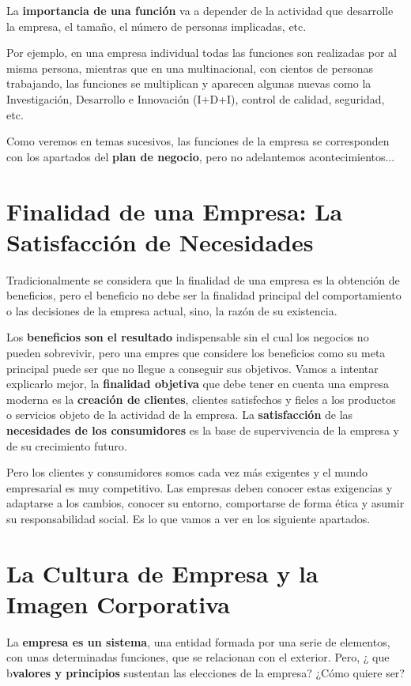 La \textbf{importancia de una función} va a depender de la actividad que desarrolle la empresa, el tamaño, el número de personas implicadas, etc.

Por ejemplo, en una empresa individual todas las funciones son realizadas por al misma persona, mientras que en una multinacional, con cientos de personas trabajando, las funciones se multiplican y aparecen algunas nuevas como la Investigación, Desarrollo e Innovación (I+D+I), control de calidad, seguridad, etc.

Como veremos en temas sucesivos, las funciones de la empresa se corresponden con los apartados del \textbf{plan de negocio}, pero no adelantemos acontecimientos...

\section{Finalidad de una Empresa: La Satisfacción de Necesidades}
Tradicionalmente se considera que la finalidad de una empresa es la obtención de beneficios, pero el beneficio no debe ser la finalidad principal del comportamiento o las decisiones de la empresa actual, sino, la razón de su existencia.

Los \textbf{beneficios son el resultado} indispensable sin el cual los negocios no pueden sobrevivir, pero una empres que considere los beneficios como su meta principal puede ser que no llegue a conseguir sus objetivos. Vamos a intentar explicarlo mejor, la \textbf{finalidad objetiva} que debe tener en cuenta una empresa moderna es la \textbf{creación de clientes}, clientes satisfechos y fieles a los productos o servicios objeto de la actividad de la empresa. La \textbf{satisfacción} de las \textbf{necesidades de los consumidores} es la base de supervivencia de la empresa y de su crecimiento futuro.

Pero los clientes y consumidores somos cada vez más exigentes y el mundo empresarial es muy competitivo. Las empresas deben conocer estas exigencias y adaptarse a los cambios, conocer su entorno, comportarse de forma ética y asumir su responsabilidad social. Es lo que vamos a ver en los siguiente apartados.

\section{La Cultura de Empresa y la Imagen Corporativa}
La \textbf{empresa es un sistema}, una entidad formada por una serie de elementos, con unas determinadas funciones, que se relacionan con el exterior. Pero, ¿ que b\textbf{valores y principios} sustentan las elecciones de la empresa? ¿Cómo quiere ser?

